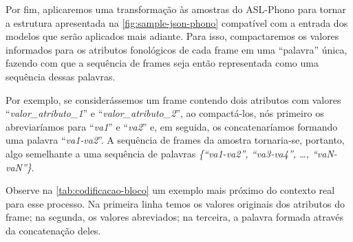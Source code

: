 Por fim, aplicaremos uma transformação às amostras do ASL-Phono para tornar a estrutura apresentada na \autoref{fig:sample-json-phono} compatível com a entrada dos modelos que serão aplicados mais adiante.
Para isso, compactaremos os valores informados para os atributos fonológicos de cada frame em uma ``palavra'' única, fazendo com que a sequência de frames seja então representada como uma sequência dessas palavras.

Por exemplo, se considerássemos um frame contendo dois atributos com valores ``\textit{valor\_atributo\_1}'' e ``\textit{valor\_atributo\_2}'', ao compactá-los, nós primeiro os abreviaríamos para ``\textit{va1}'' e ``\textit{va2}'' e, em seguida, os concatenaríamos formando uma palavra ``\textit{va1-va2}''.  A sequência de frames da amostra tornaria-se, portanto, algo semelhante a uma sequência de palavras \textit{\{``va1-va2'', ``va3-va4'', \dots, ``vaN-vaN''\}}.

Observe na \autoref{tab:codificacao-bloco} um exemplo mais próximo do contexto real para esse processo. Na primeira linha temos os valores originais dos atributos do frame; na segunda, os valores abreviados; na terceira, a palavra formada através da concatenação deles.




